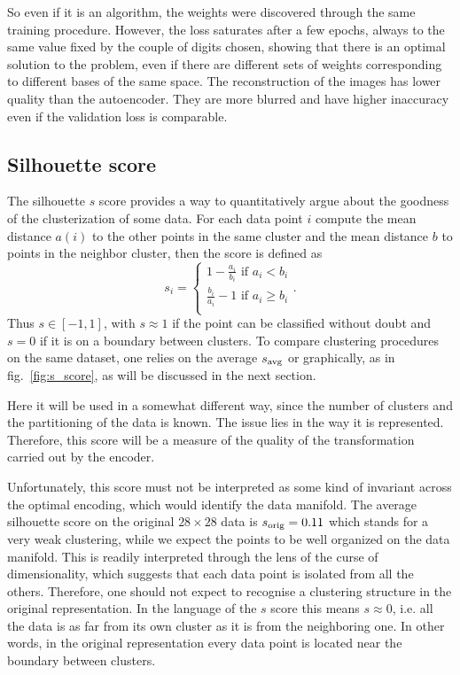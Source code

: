 \documentclass[twocolumn,gsifonts,twoside]{gsipaper}
\begin{document}
So even if it is an algorithm, the weights were discovered through the same training procedure. However, the loss saturates after a few epochs, always to the same value fixed by the couple of digits chosen, showing that there is an optimal solution to the problem, even if there are different sets of weights corresponding to different bases of the same space.
The reconstruction of the images has lower quality than the autoencoder. They are more blurred and have higher inaccuracy even if the validation loss is comparable.

\subsection{Silhouette score}
The silhouette $s$ score \cite{Rousseeuw1987} provides a way to quantitatively argue about the goodness of the clusterization of some data. For each data point $i$ compute the mean distance $a(i)$ to the other points in the same cluster and the mean distance $b$ to points in the neighbor cluster, then the score is defined as
\[
s_i = 
\begin{cases}
  1 - \frac{a_i}{b_i} \text{ if } a_i < b_i \\
  \frac{b_i}{a_i} - 1 \text{ if } a_i \ge b_i \\
\end{cases}.
\]
Thus $s\in[-1,1]$, with $s\approx1$ if the point can be classified without doubt and $s=0$ if it is on a boundary between clusters. To compare clustering procedures on the same dataset, one relies on the average $s_\textup{avg}$ or graphically, as in fig.~\ref{fig:s_score}, as will be discussed in the next section.

Here it will be used in a somewhat different way, since the number of clusters and the partitioning of the data is known. The issue lies in the way it is represented. Therefore, this score will be a measure of the quality of the transformation carried out by the encoder.

Unfortunately, this score must not be interpreted as some kind of invariant across the optimal encoding, which would identify the data manifold. The average silhouette score on the original $28\times28$ data is $s_\textup{orig} = 0.11$ which stands for a very weak clustering, while we expect the points to be well organized on the data manifold. This is readily interpreted through the lens of the curse of dimensionality, which suggests that each data point is isolated from all the others. Therefore, one should not expect to recognise a clustering structure in the original representation. In the language of the $s$ score this means $s\approx0$, i.e. all the data is as far from its own cluster as it is from the neighboring one. In other words, in the original representation every data point is located near the boundary between clusters.
\end{document}
